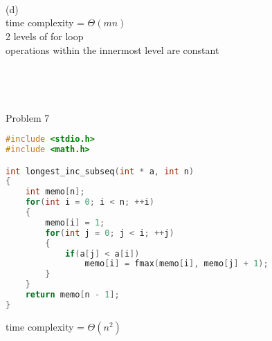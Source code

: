 \documentclass[12pt,border=4pt,multi]{article}%
\begin{document}
\leavevmode
\\
\\
\\
(d)\\
time complexity = $\Theta(mn)$\\
2 levels of for loop\\
operations within the innermost level are constant\\
\\
\\
\\
\\
Problem 7
\begin{lstlisting}[language = c]
#include <stdio.h>
#include <math.h>

int longest_inc_subseq(int * a, int n)
{
    int memo[n];
    for(int i = 0; i < n; ++i)
    {
        memo[i] = 1;
        for(int j = 0; j < i; ++j)
        {
            if(a[j] < a[i])
                memo[i] = fmax(memo[i], memo[j] + 1);
        }
    }
    return memo[n - 1];
}
\end{lstlisting}
time complexity = $\Theta(n^2)$\\
\end{document}

